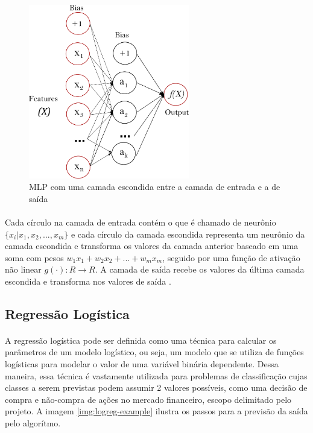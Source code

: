 \documentclass[grad,numbers]{coppe}
\begin{document}
                \begin{figure}[h]
                    \caption{MLP com uma camada escondida entre a camada de entrada e a de saída}
                    \label{img:mlp-example}
                    \includegraphics[width=7cm]{mlp-example.png}
                    \centering
                \end{figure}
                
                \paragraph{}Cada círculo na camada de entrada contém o que é chamado de neurônio $\{x_i|x_1,x_2,...,x_m\}$ e cada círculo da camada escondida representa um neurônio da camada escondida e transforma os valores da camada anterior baseado em uma soma com pesos $w_1x_1 + w_2x_2 + ... + w_mx_m$, seguido por uma função de ativação não linear $g(\cdot) : R \xrightarrow{} R$. A camada de saída recebe os valores da última camada escondida e transforma nos valores de saída \cite{mlp-model}.
                
            \subsection{Regressão Logística}
            
                \paragraph{}A regressão logística pode ser definida como uma técnica para calcular os parâmetros de um modelo logístico, ou seja, um modelo que se utiliza de funções logísticas para modelar o valor de uma variável binária dependente. Dessa maneira, essa técnica é vastamente utilizada para problemas de classificação cujas classes a serem previstas podem assumir 2 valores possíveis, como uma decisão de compra e não-compra de ações no mercado financeiro, escopo delimitado pelo projeto. A imagem \ref{img:logreg-example} ilustra os passos para a previsão da saída pelo algorítmo.
                
\end{document}
